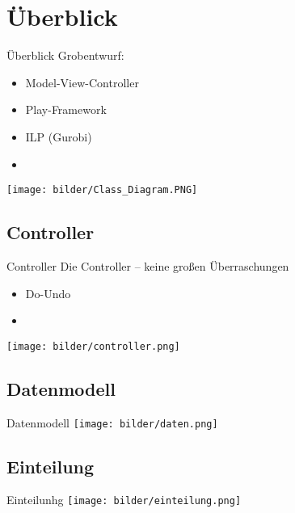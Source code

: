 \documentclass[18pt]{beamer}
\begin{document}
\section{Überblick}
\begin{frame}{Überblick}
Grobentwurf:
\begin{itemize}
  \item Model-View-Controller
  \item Play-Framework
  \item ILP (Gurobi)
  \item %
\end{itemize}
\end{frame}

\begin{frame}
\texttt{[image: bilder/Class\_Diagram.PNG]}
\end{frame}

\subsection{Controller}
\begin{frame}{Controller}
Die Controller -- keine großen Überraschungen
\begin{itemize}
  \item Do-Undo %
  \item %
\end{itemize}
\texttt{[image: bilder/controller.png]}
\end{frame}

\subsection{Datenmodell}
\begin{frame}{Datenmodell}
\texttt{[image: bilder/daten.png]}
\end{frame}

\subsection{Einteilung}
\begin{frame}{Einteilunhg}
\texttt{[image: bilder/einteilung.png]}
\end{frame}
\end{document}
